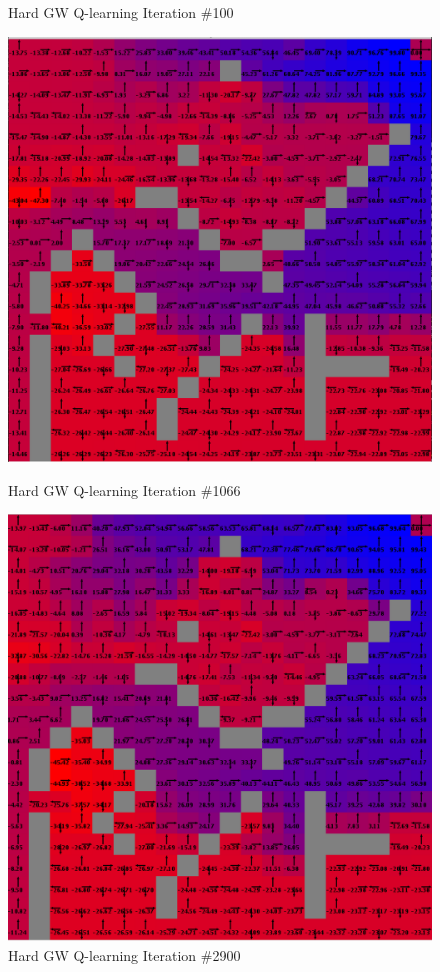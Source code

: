 \documentclass[h]{article}
\begin{document}
\begin{figure}[H]
      \caption*{Hard GW Q-learning Iteration \#100} 
   \endminipage\hfill
      \includegraphics[width=1\textwidth,keepaspectratio]{hard-q-1066.png} 
      \caption*{Hard GW Q-learning Iteration \#1066} 
   \endminipage\hfill
      \includegraphics[width=1\textwidth,keepaspectratio]{hard-q-2900.png} 
      \caption*{Hard GW Q-learning Iteration \#2900} 
   \endminipage\hfill
\end{figure}
\end{document}
